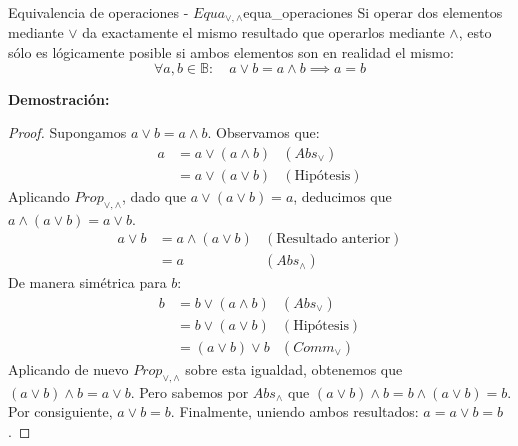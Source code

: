 \documentclass[12pt,a4paper]{article}
\newcommand{\desplegable}[2]{%
  \par\vspace{1ex}\noindent
  \textbf{Demostración:}
  \vspace{1ex}
  
  #2
  \par\vspace{1ex}
}
\begin{document}
\begin{teorema}{Equivalencia de operaciones - $Equa_{\vee,\wedge}$}{equa_operaciones}
Si operar dos elementos mediante $\vee$ da exactamente el mismo resultado que operarlos mediante $\wedge$, esto sólo es lógicamente posible si ambos elementos son en realidad el mismo:
\[ \forall a, b \in \mathbb{B}: \quad a \vee b = a \wedge b \implies a = b \]
\end{teorema}
\desplegable{proof_equa_operaciones}{
\begin{proof}
Supongamos $a \vee b = a \wedge b$. Observamos que:
\begin{align*}
    a &= a \vee (a \wedge b) & (Abs_\vee) \\
      &= a \vee (a \vee b) & (\text{Hipótesis})
\end{align*}
Aplicando $Prop_{\vee,\wedge}$, dado que $a \vee (a \vee b) = a$, deducimos que $a \wedge (a \vee b) = a \vee b$.
\begin{align*}
    a \vee b &= a \wedge (a \vee b) & (\text{Resultado anterior}) \\
             &= a & (Abs_\wedge)
\end{align*}
De manera simétrica para $b$:
\begin{align*}
    b &= b \vee (a \wedge b) & (Abs_\vee) \\
      &= b \vee (a \vee b) & (\text{Hipótesis}) \\
      &= (a \vee b) \vee b & (Comm_\vee)
\end{align*}
Aplicando de nuevo $Prop_{\vee,\wedge}$ sobre esta igualdad, obtenemos que $(a \vee b) \wedge b = a \vee b$. Pero sabemos por $Abs_\wedge$ que $(a \vee b) \wedge b = b \wedge (a \vee b) = b$. 
Por consiguiente, $a \vee b = b$. Finalmente, uniendo ambos resultados: $a = a \vee b = b$.
\end{proof}
}
\end{document}
